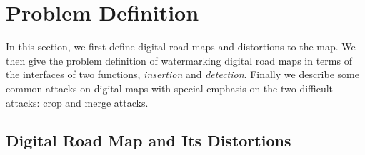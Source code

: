 \section{Problem Definition}
\label{sec:problem}
In this section, we first define digital road maps and distortions
to the map. We then give the problem definition of watermarking digital road maps
in terms of the interfaces of two functions, {\em insertion} and {\em detection}. 
Finally we describe some common attacks on digital maps with special emphasis 
on the two difficult attacks: crop and merge attacks. 


\subsection{Digital Road Map and Its Distortions}
%
%
